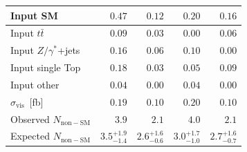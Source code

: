 \begin{table}
\begin{center}
\begin{tabular}{lrrrr}
      \midrule
      Input SM                       & $0.47$                & $0.12$                & $0.20$                & $0.16$           \\
      \midrule
      Input $t\bar{t}$               & $0.09$                & $0.03$                & $0.00$                & $0.06$           \\
      Input $Z/\gamma^{*}$+jets      & $0.16$                & $0.06$                & $0.10$                & $0.00$           \\
      Input single Top               & $0.18$                & $0.03$                & $0.05$                & $0.09$           \\
      Input other                    & $0.04$                & $0.00$                & $0.04$                & $0.00$           \\
      \midrule
      $\sigma_\mathrm{vis}$~[fb]     & $0.19$                & $0.10$                & $0.20$                & $0.10$                \\
      Observed $N_\mathrm{non-SM}$   & $3.9$                 & $2.1$                 & $4.0$                 & $2.1$                 \\
      Expected $N_\mathrm{non-SM}$   & ${3.5}^{+1.9}_{-1.4}$ & ${2.6}^{+1.6}_{-0.6}$ & ${3.0}^{+1.7}_{-1.0}$ & ${2.7}^{+1.6}_{-0.7}$ \\
      \bottomrule
    \end{tabular}
  \end{center}
\end{table}

